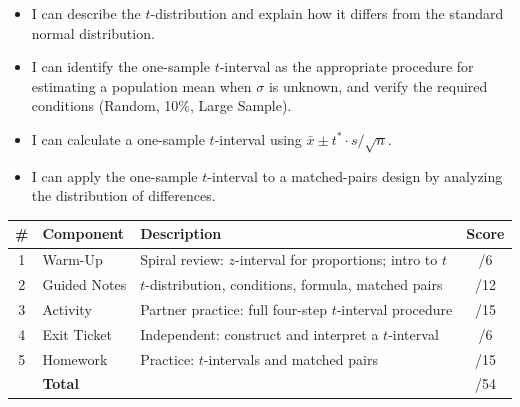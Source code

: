 \documentclass[10pt]{article}
\begin{document}

\vspace{2.4cm}
\namedateperiod

\begin{learningtargetbox}
\begin{itemize}
    \item I can describe the $t$-distribution and explain how it differs from the
          standard normal distribution.
    \item I can identify the one-sample $t$-interval as the appropriate procedure for
          estimating a population mean when $\sigma$ is unknown, and verify the required
          conditions (Random, 10\%, Large Sample).
    \item I can calculate a one-sample $t$-interval using $\bar x \pm t^* \cdot s/\sqrt{n}$.
    \item I can apply the one-sample $t$-interval to a matched-pairs design by analyzing
          the distribution of differences.
\end{itemize}
\end{learningtargetbox}

\begin{tocbox}
\renewcommand{\arraystretch}{1.5}
\begin{tabularx}{\linewidth}{clXc}
    \textbf{\#} & \textbf{Component} & \textbf{Description} & \textbf{Score} \\
    \hline
    1 & Warm-Up      & Spiral review: $z$-interval for proportions; intro to $t$ & \hfill/6 \\
    2 & Guided Notes & $t$-distribution, conditions, formula, matched pairs         & \hfill/12 \\
    3 & Activity     & Partner practice: full four-step $t$-interval procedure       & \hfill/15 \\
    4 & Exit Ticket  & Independent: construct and interpret a $t$-interval           & \hfill/6 \\
    5 & Homework     & Practice: $t$-intervals and matched pairs                     & \hfill/15 \\
    \hline
       & \multicolumn{2}{l}{\textbf{Total}} & \hfill/54 \\
\end{tabularx}
\end{tocbox}
\end{document}
